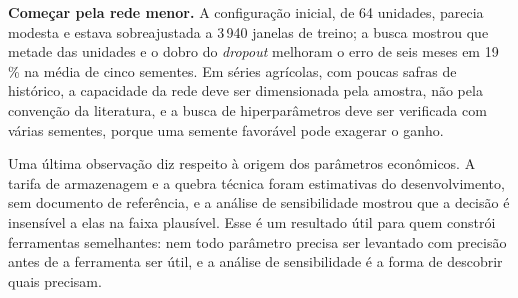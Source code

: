 \begin{alineas}
	\item \textbf{Começar pela rede menor.} A configuração inicial, de 64 unidades, parecia modesta e estava sobreajustada a 3\,940 janelas de treino; a busca mostrou que metade das unidades e o dobro do \textit{dropout} melhoram o erro de seis meses em 19\,\% na média de cinco sementes. Em séries agrícolas, com poucas safras de histórico, a capacidade da rede deve ser dimensionada pela amostra, não pela convenção da literatura, e a busca de hiperparâmetros deve ser verificada com várias sementes, porque uma semente favorável pode exagerar o ganho.
\end{alineas}

Uma última observação diz respeito à origem dos parâmetros econômicos. A tarifa de armazenagem e a quebra técnica foram estimativas do desenvolvimento, sem documento de referência, e a análise de sensibilidade mostrou que a decisão é insensível a elas na faixa plausível. Esse é um resultado útil para quem constrói ferramentas semelhantes: nem todo parâmetro precisa ser levantado com precisão antes de a ferramenta ser útil, e a análise de sensibilidade é a forma de descobrir quais precisam.
